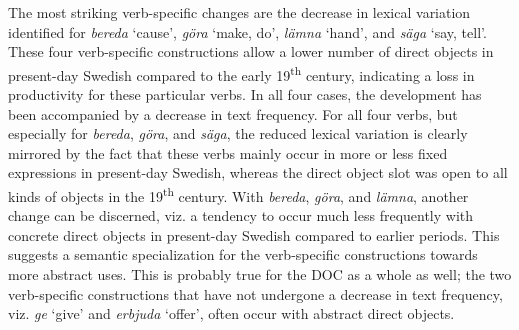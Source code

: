 \documentclass[output=paper]{langscibook}
\begin{document}
The most striking verb-specific changes are the decrease in lexical variation identified for \textit{bereda} ‘cause’, \textit{göra} ‘make, do’, \textit{lämna} ‘hand’, and \textit{säga} ‘say, tell’. These four verb-specific constructions allow a lower number of direct objects in present-day Swedish compared to the early 19\textsuperscript{th} century, indicating a loss in productivity for these particular verbs. In all four cases, the development has been accompanied by a decrease in text frequency. For all four verbs, but especially for \textit{bereda}, \textit{göra}, and \textit{säga}, the reduced lexical variation is clearly mirrored by the fact that these verbs mainly occur in more or less fixed expressions in present-day Swedish, whereas the direct object slot was open to all kinds of objects in the 19\textsuperscript{th} century. With \textit{bereda}, \textit{göra}, and \textit{lämna}, another change can be discerned, viz. a tendency to occur much less frequently with concrete direct objects in present-day Swedish compared to earlier periods. This suggests a semantic specialization for the verb-specific constructions towards more abstract uses. This is probably true for the DOC as a whole as well; the two verb-specific constructions that have not undergone a decrease in text frequency, viz. \textit{ge} ‘give’ and \textit{erbjuda} ‘offer’, often occur with abstract direct objects.
\end{document}
